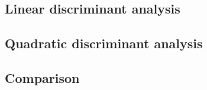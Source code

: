 \documentclass[a4paper, 12pt]{article}
\begin{document}
\subsection*{Linear discriminant analysis}
\subsection*{Quadratic discriminant analysis}
\subsection*{Comparison}


\clearpage
\appendix

% 
\end{document}
